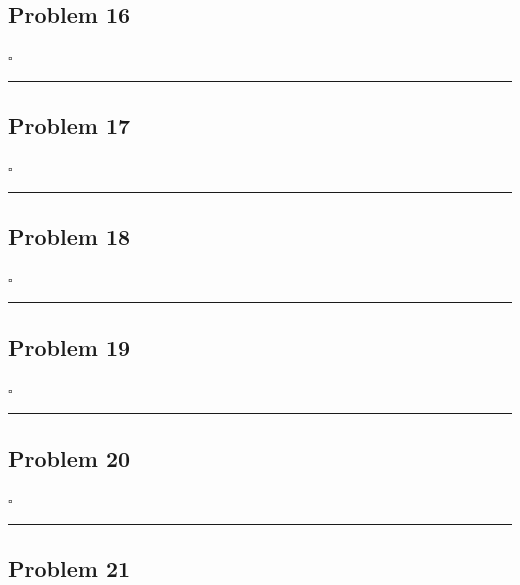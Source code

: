 \documentclass[12pt]{article}
\newcommand*{\QEDB}{\hfill\ensuremath{\square}}
\newcommand{\horrule}[1]{\rule{\linewidth}{#1}}
\begin{document}
\subsection*{Problem 16}

\QEDB

\horrule{0.5pt}

\subsection*{Problem 17}

\QEDB

\horrule{0.5pt}

\subsection*{Problem 18}

\QEDB

\horrule{0.5pt}

\subsection*{Problem 19}

\QEDB

\horrule{0.5pt}

\subsection*{Problem 20}

\QEDB

\horrule{0.5pt}

\subsection*{Problem 21}
\end{document}
